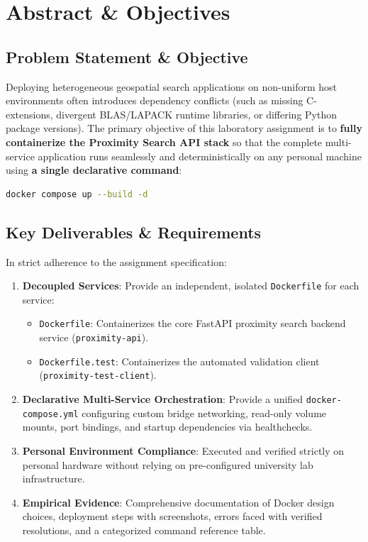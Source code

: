 \documentclass[11pt,a4paper]{article}
\begin{document}
\section{Abstract \& Objectives}

\subsection{Problem Statement \& Objective}
Deploying heterogeneous geospatial search applications on non-uniform host environments often introduces dependency conflicts (such as missing C-extensions, divergent BLAS/LAPACK runtime libraries, or differing Python package versions). The primary objective of this laboratory assignment is to \textbf{fully containerize the Proximity Search API stack} so that the complete multi-service application runs seamlessly and deterministically on any personal machine using \textbf{a single declarative command}:
\begin{lstlisting}[language=bash]
docker compose up --build -d
\end{lstlisting}

\subsection{Key Deliverables \& Requirements}
In strict adherence to the assignment specification:
\begin{enumerate}[label=\arabic*), itemsep=1pt, topsep=2pt]
    \item \textbf{Decoupled Services}: Provide an independent, isolated \texttt{Dockerfile} for each service:
    \begin{itemize}[itemsep=1pt]
        \item \texttt{Dockerfile}: Containerizes the core FastAPI proximity search backend service (\texttt{proximity-api}).
        \item \texttt{Dockerfile.test}: Containerizes the automated validation client (\texttt{proximity-test-client}).
    \end{itemize}
    \item \textbf{Declarative Multi-Service Orchestration}: Provide a unified \texttt{docker-compose.yml} configuring custom bridge networking, read-only volume mounts, port bindings, and startup dependencies via healthchecks.
    \item \textbf{Personal Environment Compliance}: Executed and verified strictly on personal hardware without relying on pre-configured university lab infrastructure.
    \item \textbf{Empirical Evidence}: Comprehensive documentation of Docker design choices, deployment steps with screenshots, errors faced with verified resolutions, and a categorized command reference table.
\end{enumerate}
\end{document}
